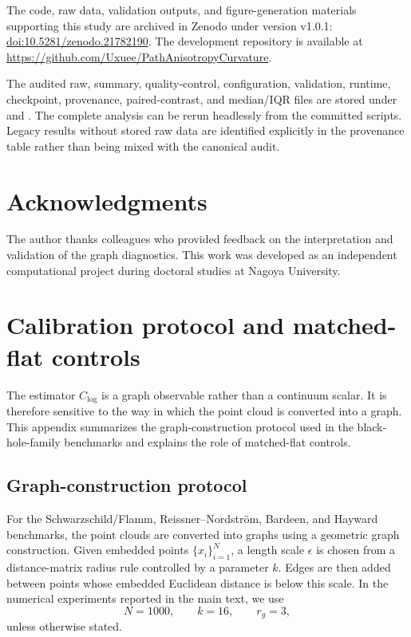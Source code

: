 \documentclass[11pt,a4paper]{article}
\begin{document}
The code, raw data, validation outputs, and figure-generation materials supporting this study are archived in Zenodo under version v1.0.1: \href{https://doi.org/10.5281/zenodo.21782190}{doi:10.5281/zenodo.21782190}. The development repository is available at \url{https://github.com/Uxuee/PathAnisotropyCurvature}.

The audited raw, summary, quality-control, configuration, validation, runtime, checkpoint, provenance, paired-contrast, and median/IQR files are stored under  and . The complete analysis can be rerun headlessly from the committed scripts. Legacy results without stored raw data are identified explicitly in the provenance table rather than being mixed with the canonical audit.

\section*{Acknowledgments}

The author thanks colleagues who provided feedback on the interpretation and validation of the graph diagnostics. This work was developed as an independent computational project during doctoral studies at Nagoya University.


\appendix

\section{Calibration protocol and matched-flat controls}
\label{app:graph-construction}

The estimator $C_{\log}$ is a graph observable rather than a continuum scalar. It is therefore sensitive to the way in which the point cloud is converted into a graph. This appendix summarizes the graph-construction protocol used in the black-hole-family benchmarks and explains the role of matched-flat controls.

\subsection{Graph-construction protocol}

For the Schwarzschild/Flamm, Reissner--Nordstr\"om, Bardeen, and Hayward benchmarks, the point clouds are converted into graphs using a geometric graph construction. Given embedded points $\{x_i\}_{i=1}^{N}$, a length scale $\epsilon$ is chosen from a distance-matrix radius rule controlled by a parameter $k$. Edges are then added between points whose embedded Euclidean distance is below this scale. In the numerical experiments reported in the main text, we use
\begin{equation}
    N=1000,
    \qquad
    k=16,
    \qquad
    r_g=3,
\end{equation}
unless otherwise stated.
\end{document}
